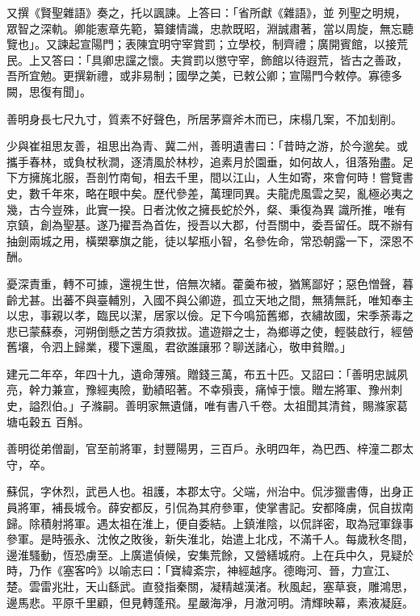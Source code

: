 \begin{pinyinscope}
 又撰《賢聖雜語》奏之，托以諷諫。上答曰：「省所獻《雜語》，並
 列聖之明規，眾智之深軌。卿能憲章先範，纂鏤情識，忠款既昭，淵誠肅著，當以周旋，無忘聽覽也」。又諫起宣陽門；表陳宜明守宰賞罰；立學校，制齊禮；廣開賓館，以接荒民。上又答曰：「具卿忠讜之懷。夫賞罰以懲守宰，飾館以待遐荒，皆古之善政，吾所宜勉。更撰新禮，或非易制；國學之美，已敕公卿；宣陽門今敕停。寡德多闕，思復有聞」。



 善明身長七尺九寸，質素不好聲色，所居茅齋斧木而已，床榻几案，不加刬削。



 少與崔祖思友善，祖思出為青、冀二州，善明遺書曰：「昔時之游，於今邈矣。或攜手春林，或負杖秋澗，逐清風於林杪，追素月於園垂，如何故人，徂落殆盡。足下方擁旄北服，吾剖竹南甸，相去千里，間以江山，人生如寄，來會何時！嘗覽書史，數千年來，略在眼中矣。歷代參差，萬理同異。夫龍虎風雲之契，亂極必夷之幾，古今豈殊，此實一揆。日者沈攸之擁長蛇於外，粲、秉復為異
 識所推，唯有京鎮，創為聖基。遂乃擢吾為首佐，授吾以大郡，付吾關中，委吾留任。既不辦有抽劍兩城之用，橫槊搴旗之能，徒以挈瓶小智，名參佐命，常恐朝露一下，深恩不酬。



 憂深責重，轉不可據，還視生世，倍無次緒。藿羹布被，猶篤鄙好；惡色憎聲，暮齡尤甚。出蕃不與臺輔別，入國不與公卿遊，孤立天地之間，無猜無託，唯知奉主以忠，事親以孝，臨民以潔，居家以儉。足下今鳴笳舊鄉，衣繡故國，宋季荼毒之悲已蒙蘇泰，河朔倒懸之苦方須救拔。遣遊辯之士，為鄉導之使，輕裝啟行，經營舊壤，令泗上歸業，稷下還風，君欲誰讓邪？聊送諸心，敬申貧贈。」



 建元二年卒，年四十九，遺命薄殯。贈錢三萬，布五十匹。又詔曰：「善明忠誠夙亮，幹力兼宣，豫經夷險，勤績昭著。不幸殞喪，痛悼于懷。贈左將軍、豫州刺史，謚烈伯。」子滌嗣。善明家無遺儲，唯有書八千卷。太祖聞其清貧，賜滌家葛塘屯穀五
 百斛。



 善明從弟僧副，官至前將軍，封豐陽男，三百戶。永明四年，為巴西、梓潼二郡太守，卒。



 蘇侃，字休烈，武邑人也。祖護，本郡太守。父端，州治中。侃涉獵書傳，出身正員將軍，補長城令。薛安都反，引侃為其府參軍，使掌書記。安都降虜，侃自拔南歸。除積射將軍。遇太祖在淮上，便自委結。上鎮淮陰，以侃詳密，取為冠軍錄事參軍。是時張永、沈攸之敗後，新失淮北，始遣上北戍，不滿千人。每歲秋冬間，邊淮騷動，恆恐虜至。上廣遣偵候，安集荒餘，又營繕城府。上在兵中久，見疑於時，乃作《塞客吟》以喻志曰：「寶緯紊宗，神經越序。德晦河、晉，力宣江、楚。雲雷兆壯，天山繇武。直發指秦關，凝精越漢渚。秋風起，塞草衰，雕鴻思，邊馬悲。平原千里顧，但見轉蓬飛。星嚴海凈，月澈河明。清輝映幕，素液凝庭。




\end{pinyinscope}
